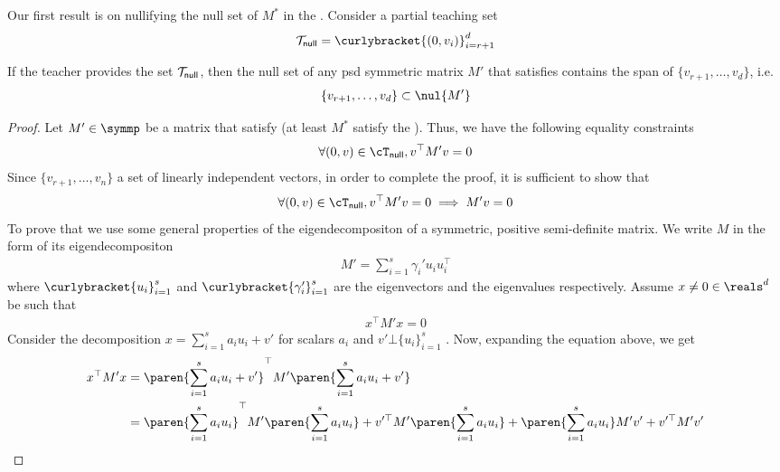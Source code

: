Our first result is on nullifying the null set of $M^*$ in the . Consider a partial teaching set 
\begin{align*}
    \mathcal{T}_{\sf {null}} = \curlybracket{(0, v_{i})}_{i = r+1}^d
\end{align*}
\begin{lemma}\label{lem: nullset}
    If the teacher provides the set $\mathcal{T}_{\sf{null}}$, then the null set of any psd symmetric matrix $M'$ that satisfies  contains the span of $\{v_{r+1},\ldots, v_d\}$, i.e.
    \begin{align*}
       \{v_{r+1},\ldots, v_d\} \subset \nul{M'}
    \end{align*}
\end{lemma}
\begin{proof}
    Let $M' \in \symmp$ be a matrix that satisfy  (at least $M^*$ satisfy the ). Thus, we have the following equality constraints
    \begin{align*}
        \forall (0,v) \in \cT_{\sf {null}}, v^{\top}M'v = 0
    \end{align*}
    Since $\{v_{r+1},\ldots, v_n\}$ a set of linearly independent vectors, in order to complete the proof, it is sufficient to show that
    \begin{align}
       \forall (0,v) \in \cT_{\sf {null}}, v^{\top}M'v = 0 \implies M'v = 0 \label{eq: lemmain}
    \end{align}
    To prove that we use some general properties of the eigendecompositon of a symmetric, positive semi-definite matrix. We write $M$ in the form of its eigendecompositon 
    \begin{align*}
        M' = \sum_{i = 1}^{s} \gamma_i'u_iu_i^{\top}
    \end{align*}
    where $\curlybracket{u_i}_{i=1}^{s}$ and $\curlybracket{\gamma'_i}_{i=1}^s$ are the eigenvectors and the eigenvalues respectively. Assume $x\neq 0 \in \reals^d$ be such that
    \begin{align*}
        x^{\top}M'x = 0
    \end{align*}
    Consider the decomposition $x = \sum_{i=1}^s a_iu_i + v'$ for scalars $a_i$ and $v' \bot \{u_i\}_{i=1}^s$ . Now, expanding the equation above, we get
    \begin{align*}
       x^{\top}M'x &= \paren{\sum_{i=1}^s a_iu_i + v'}^{\top}M'\paren{\sum_{i=1}^s a_iu_i + v'}  \\
       & = \paren{\sum_{i=1}^s a_iu_i}^{\top}M'\paren{\sum_{i=1}^s a_iu_i } + v'^{\top}M'\paren{\sum_{i=1}^s a_iu_i} + \paren{\sum_{i=1}^s a_iu_i}M'v' + v'^{\top}M'v'\\

\end{align*}
\end{proof}
